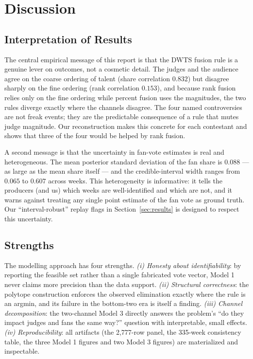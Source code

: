 \documentclass{article}
\begin{document}
\section{Discussion}\label{sec:discussion}

\subsection{Interpretation of Results}

The central empirical message of this report is that the DWTS fusion rule is a genuine
lever on outcomes, not a cosmetic detail. The judges and the audience agree on the coarse
ordering of talent (share correlation $0.832$) but disagree sharply on the fine ordering
(rank correlation $0.153$), and because rank fusion relies only on the fine ordering while
percent fusion uses the magnitudes, the two rules diverge exactly where the channels
disagree. The four named controversies are not freak events; they are the predictable
consequence of a rule that mutes judge magnitude. Our reconstruction makes this concrete for
each contestant and shows that three of the four would be helped by rank fusion.

A second message is that the uncertainty in fan-vote estimates is real and heterogeneous.
The mean posterior standard deviation of the fan share is $0.088$ --- as large as the mean
share itself --- and the credible-interval width ranges from $0.065$ to $0.607$ across weeks.
This heterogeneity is informative: it tells the producers (and us) which weeks are
well-identified and which are not, and it warns against treating any single point estimate
of the fan vote as ground truth. Our ``interval-robust'' replay flags in
Section~\ref{sec:results} is designed to respect this uncertainty.

\subsection{Strengths}

The modelling approach has four strengths. \emph{(i) Honesty about identifiability}: by
reporting the feasible set rather than a single fabricated vote vector, Model 1 never claims
more precision than the data support. \emph{(ii) Structural correctness}: the polytope
construction enforces the observed elimination exactly where the rule is an argmin, and its
failure in the bottom-two era is itself a finding. \emph{(iii) Channel decomposition}: the
two-channel Model 3 directly answers the problem's ``do they impact judges and fans the same
way?'' question with interpretable, small effects. \emph{(iv) Reproducibility}: all
artifacts (the 2{,}777-row panel, the 335-week consistency table, the three Model 1 figures
and two Model 3 figures) are materialized and inspectable.
\end{document}
